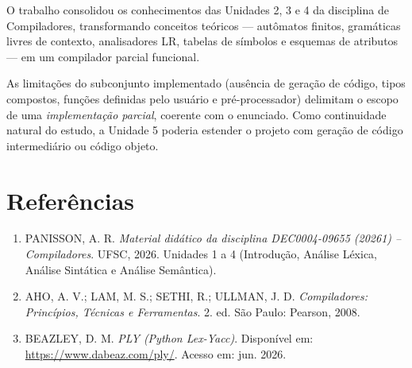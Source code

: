 \documentclass[12pt,a4paper]{article}
\begin{document}
O trabalho consolidou os conhecimentos das Unidades 2, 3 e 4 da disciplina de
Compiladores, transformando conceitos teóricos --- autômatos finitos, gramáticas
livres de contexto, analisadores LR, tabelas de símbolos e esquemas de atributos ---
em um compilador parcial funcional.

As limitações do subconjunto implementado (ausência de geração de código, tipos
compostos, funções definidas pelo usuário e pré-processador) delimitam o escopo de
uma \textit{implementação parcial}, coerente com o enunciado. Como continuidade
natural do estudo, a Unidade 5 poderia estender o projeto com geração de código
intermediário ou código objeto.

\section*{Referências}

\begin{enumerate}
  \item PANISSON, A. R. \textit{Material didático da disciplina DEC0004-09655 (20261) -- Compiladores}. UFSC, 2026. Unidades 1 a 4 (Introdução, Análise Léxica, Análise Sintática e Análise Semântica).
  \item AHO, A. V.; LAM, M. S.; SETHI, R.; ULLMAN, J. D. \textit{Compiladores: Princípios, Técnicas e Ferramentas}. 2. ed. São Paulo: Pearson, 2008.
  \item BEAZLEY, D. M. \textit{PLY (Python Lex-Yacc)}. Disponível em: \url{https://www.dabeaz.com/ply/}. Acesso em: jun. 2026.
\end{enumerate}
\end{document}
